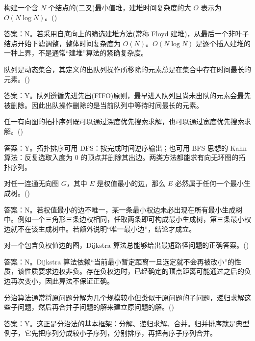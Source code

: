 \begin{question}
构建一个含 $N$ 个结点的(二叉)最小值堆，建堆时间复杂度的大 $O$ 表示为 $O(N\log N)$。(\quad)
\begin{solution}
答案：N。若采用自底向上的筛选建堆方法(常称 Floyd 建堆)，从最后一个非叶子结点开始下滤调整，整体时间复杂度为 $O(N)$。$O(N\log N)$ 是逐个插入建堆的一种上界，不是通常“建堆”算法的紧确复杂度。
\end{solution}
\end{question}

\begin{question}
队列是动态集合，其定义的出队列操作所移除的元素总是在集合中存在时间最长的元素。(\quad)
\begin{solution}
答案：Y。队列遵循先进先出(FIFO)原则，最早进入队列且尚未出队的元素会最先被删除。因此出队操作删除的是当前队列中等待时间最长的元素。
\end{solution}
\end{question}

\begin{question}
任一有向图的拓扑序列既可以通过深度优先搜索求解，也可以通过宽度优先搜索求解。(\quad)
\begin{solution}
答案：Y。拓扑排序可用 DFS：按完成时间逆序输出；也可用 BFS 思想的 Kahn 算法：反复选取入度为 $0$ 的顶点并删除其出边。两类方法都能求有向无环图的拓扑序列。
\end{solution}
\end{question}

\begin{question}
对任一连通无向图 $G$，其中 $E$ 是权值最小的边，那么 $E$ 必然属于任何一个最小生成树。(\quad)
\begin{solution}
答案：N。若权值最小的边不唯一，某一条最小权边未必出现在所有最小生成树中。例如一个三角形三条边权相同，任取两条即可构成最小生成树，第三条最小权边就不在该生成树中。若额外说明“唯一最小边”，结论才成立。
\end{solution}
\end{question}

\begin{question}
对一个包含负权值边的图，Dijkstra 算法总能够给出最短路径问题的正确答案。(\quad)
\begin{solution}
答案：N。Dijkstra 算法依赖“当前最小暂定距离一旦选定就不会再被改小”的性质，该性质要求边权非负。存在负权边时，已经确定的顶点距离可能通过之后的负边再次变小，因此算法不保证正确。
\end{solution}
\end{question}

\begin{question}
分治算法通常将原问题分解为几个规模较小但类似于原问题的子问题，递归求解这些子问题，然后再合并子问题的解来建立原问题的解。(\quad)
\begin{solution}
答案：Y。这正是分治法的基本框架：分解、递归求解、合并。归并排序就是典型例子，它先把序列分成较小子序列，分别排序，再把有序子序列合并。
\end{solution}
\end{question}

